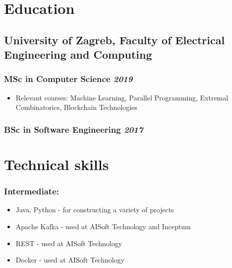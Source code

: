 \documentclass[a4paper]{article}
\newcommand{\bolditalicpair}
[2]
{\textbf{#1} \texorpdfstring{\hfill}{} \textit{#2}}
\begin{document}



\section{Education}
\subsection{\bolditalicpair{University of Zagreb, Faculty of Electrical Engineering and Computing}{}}

\subsubsection{\bolditalicpair{MSc in Computer Science}{2019}}

\begin{itemize}
  \item Relevant courses: Machine Learning, Parallel Programming, Extremal Combinatorics, Blockchain Technologies %
\end{itemize}

\subsubsection{\bolditalicpair{BSc in Software Engineering}{2017}}



\section{Technical skills}
\subsubsection{\bolditalicpair{Intermediate:}{}}

\begin{itemize}
  \item Java, Python - for constructing a variety of projects
  \item Apache Kafka - used at AISoft Technology and Inceptum
  \item REST - used at AISoft Technology
  \item Docker - used at AISoft Technology
\end{itemize}
\end{document}
